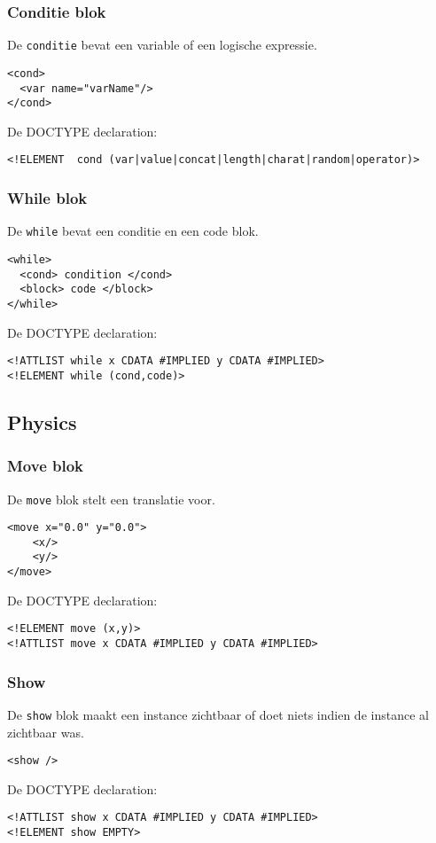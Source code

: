 \documentclass[]{article}
\begin{document}
\subsubsection{Conditie blok}
De \texttt{conditie} bevat een variable of een logische expressie.
\lstset{language=XML}
\begin{lstlisting}
<cond>
  <var name="varName"/>
</cond>
\end{lstlisting}
De DOCTYPE declaration: 
\lstset{language=XML}
\begin{lstlisting}
<!ELEMENT  cond (var|value|concat|length|charat|random|operator)>
\end{lstlisting}
\subsubsection{While blok}
De \texttt{while} bevat een conditie en een code blok.
\lstset{language=XML}
\begin{lstlisting}
<while>
  <cond> condition </cond>
  <block> code </block>
</while>
\end{lstlisting}
De DOCTYPE declaration: 
\lstset{language=XML}
\begin{lstlisting}
<!ATTLIST while x CDATA #IMPLIED y CDATA #IMPLIED>
<!ELEMENT while (cond,code)>
\end{lstlisting}

\subsection{Physics}
\subsubsection{Move blok}
De \texttt{move} blok stelt een translatie voor.	
\lstset{language=XML}
\begin{lstlisting}
<move x="0.0" y="0.0">
    <x/>
    <y/>
</move>
\end{lstlisting}
De DOCTYPE declaration: 
\lstset{language=XML}
\begin{lstlisting}
<!ELEMENT move (x,y)>
<!ATTLIST move x CDATA #IMPLIED y CDATA #IMPLIED>
\end{lstlisting}

\subsubsection{Show}
De \texttt{show} blok maakt een instance zichtbaar of doet niets indien de instance al zichtbaar was.
\lstset{language=XML}
\begin{lstlisting}
<show />
\end{lstlisting}
De DOCTYPE declaration: 
\lstset{language=XML}
\begin{lstlisting}
<!ATTLIST show x CDATA #IMPLIED y CDATA #IMPLIED>
<!ELEMENT show EMPTY>
\end{lstlisting}
\end{document}
